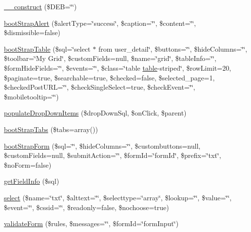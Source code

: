 \begin{DoxyCompactItemize}
\item 
\hyperlink{classCody_a55a918acdc624ced30d76711856475aa}{\+\_\+\+\_\+construct} (\$D\+E\+B=\char`\"{}\char`\"{})
\item 
\hyperlink{classCody_af81e612dbfec3bb1e5b205da1fa2e1db}{boot\+Strap\+Alert} (\$alert\+Type=\char`\"{}success\char`\"{}, \$caption=\char`\"{}\char`\"{}, \$content=\char`\"{}\char`\"{}, \$dismissible=false)
\item 
\hyperlink{classCody_ae6b08ef724d6aa5cd04281ddbc9a9301}{boot\+Strap\+Table} (\$sql=\char`\"{}select $\ast$ from user\+\_\+detail\char`\"{}, \$buttons=\char`\"{}\char`\"{}, \$hide\+Columns=\char`\"{}\char`\"{}, \$toolbar=\char`\"{}My Grid\char`\"{}, \$custom\+Fields=null, \$name=\char`\"{}grid\char`\"{}, \$table\+Info=\char`\"{}\char`\"{}, \$form\+Hide\+Fields=\char`\"{}\char`\"{}, \$events=\char`\"{}\char`\"{}, \$class=\char`\"{}table \hyperlink{Shape_8php_a5aa7b43c8ec77df216a71a27da0a321c}{table}-\/striped\char`\"{}, \$row\+Limit=20, \$paginate=true, \$searchable=true, \$checked=false, \$selected\+\_\+page=1, \$checked\+Post\+U\+R\+L=\char`\"{}\char`\"{}, \$check\+Single\+Select=true, \$check\+Event=\char`\"{}\char`\"{}, \$mobiletooltip=\char`\"{}\char`\"{})
\item 
\hyperlink{classCody_ade934190b62559aae3d784f7681253af}{populate\+Drop\+Down\+Items} (\$drop\+Down\+Sql, \$on\+Click, \$parent)
\item 
\hyperlink{classCody_a91baebb215438e27a00b211a2e352b14}{boot\+Strap\+Tabs} (\$tabs=array())
\item 
\hyperlink{classCody_a261dc6613ef1c8fa40bf4332aebaa5c0}{boot\+Strap\+Form} (\$sql=\char`\"{}\char`\"{}, \$hide\+Columns=\char`\"{}\char`\"{}, \$custombuttons=null, \$custom\+Fields=null, \$submit\+Action=\char`\"{}\char`\"{}, \$form\+Id=\char`\"{}form\+Id\char`\"{}, \$prefix=\char`\"{}txt\char`\"{}, \$no\+Form=false)
\item 
\hyperlink{classCody_a9190879d7bba88107875e2fe4723804c}{get\+Field\+Info} (\$sql)
\item 
\hyperlink{classCody_a11ec72bcb8aa970fd04b058bd3612cd0}{select} (\$name=\char`\"{}txt\char`\"{}, \$alttext=\char`\"{}\char`\"{}, \$selecttype=\char`\"{}array\char`\"{}, \$lookup=\char`\"{}\char`\"{}, \$value=\char`\"{}\char`\"{}, \$event=\char`\"{}\char`\"{}, \$cssid=\char`\"{}\char`\"{}, \$readonly=false, \$nochoose=true)
\item 
\hyperlink{classCody_ad923b413da151f230932758e98530a7f}{validate\+Form} (\$rules, \$messages=\char`\"{}\char`\"{}, \$form\+Id=\char`\"{}form\+Input\char`\"{})

\end{DoxyCompactItemize}
